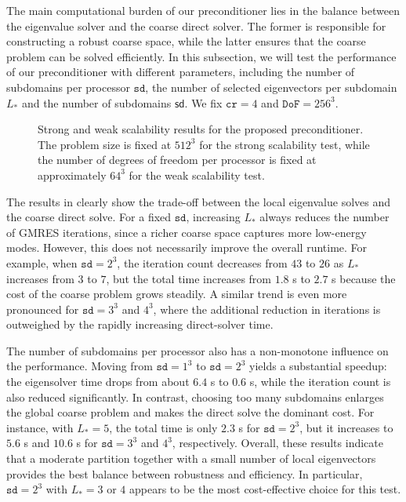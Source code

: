 \documentclass[preprint,12pt]{elsarticle}
\begin{document}
  The main computational burden of our preconditioner lies in the balance
  between the eigenvalue solver and the coarse direct solver. The former is responsible
  for constructing a robust coarse space, while the latter ensures that the
  coarse problem can be solved efficiently. In this subsection, we will test the
  performance of our preconditioner with different parameters, including the number
  of subdomains per processor $\mathtt{sd}$, the number of selected eigenvectors
  per subdomain $L_{*}$ and the number of subdomains $\mathsf{sd}$. We fix $\mathtt{cr}
  =4$ and $\mathtt{DoF}=256^{3}$.

  \begin{figure}[!ht]
    \centering
    \resizebox{\textwidth}{!}{}
    \caption{Strong and weak scalability results for the proposed preconditioner.
    The problem size is fixed at $512^{3}$ for the strong scalability test,
    while the number of degrees of freedom per processor is fixed at
    approximately $64^{3}$ for the weak scalability test.}
    \label{fig:lstar-vs-sd}
  \end{figure}

  The results in  clearly show the trade-off between the
  local eigenvalue solves and the coarse direct solve. For a fixed $\mathtt{sd}$,
  increasing $L_{*}$ always reduces the number of GMRES iterations, since a richer
  coarse space captures more low-energy modes. However, this does not necessarily
  improve the overall runtime. For example, when $\mathtt{sd}=2^{3}$, the
  iteration count decreases from $43$ to $26$ as $L_{*}$ increases from $3$ to
  $7$, but the total time increases from $1.8$ s to $2.7$ s because the cost of the
  coarse problem grows steadily. A similar trend is even more pronounced for
  $\mathtt{sd}=3^{3}$ and $4^{3}$, where the additional reduction in iterations is
  outweighed by the rapidly increasing direct-solver time.

  The number of subdomains per processor also has a non-monotone influence on the
  performance. Moving from $\mathtt{sd}=1^{3}$ to $\mathtt{sd}=2^{3}$ yields a
  substantial speedup: the eigensolver time drops from about $6.4$ s to $0.6$ s,
  while the iteration count is also reduced significantly. In contrast, choosing
  too many subdomains enlarges the global coarse problem and makes the direct
  solve the dominant cost. For instance, with $L_{*}=5$, the total time is only $2
  .3$ s for $\mathtt{sd}=2^{3}$, but it increases to $5.6$ s and $10.6$ s for
  $\mathtt{sd}=3^{3}$ and $4^{3}$, respectively. Overall, these results indicate
  that a moderate partition together with a small number of local eigenvectors provides
  the best balance between robustness and efficiency. In particular, $\mathtt{sd}
  =2^{3}$ with $L_{*}=3$ or $4$ appears to be the most cost-effective choice for
  this test.
\end{document}

